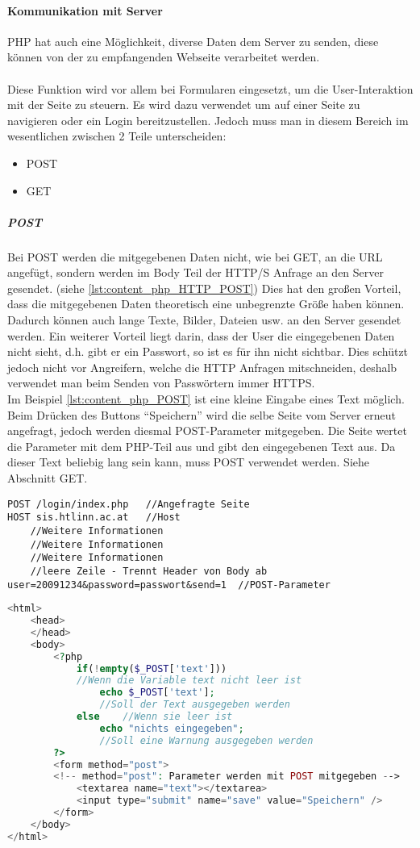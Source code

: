\paragraph{Kommunikation mit Server}
PHP hat auch eine Möglichkeit, diverse Daten dem Server zu 
senden, diese können von der zu empfangenden Webseite verarbeitet werden.\\\\
Diese Funktion wird vor allem bei Formularen eingesetzt, um die User-Interaktion mit der Seite zu steuern. Es wird dazu verwendet um auf einer Seite zu navigieren oder ein Login bereitzustellen. Jedoch muss man in diesem Bereich im wesentlichen zwischen 2 Teile unterscheiden:
\begin{itemize}
    \item POST
    \item GET
\end{itemize}
\subparagraph{POST\\}
Bei POST werden die mitgegebenen Daten nicht, wie bei GET, an die URL angefügt, sondern werden im Body Teil der HTTP/S Anfrage an den Server gesendet. (siehe \autoref{lst:content_php_HTTP_POST}) Dies hat den großen Vorteil, dass die mitgegebenen Daten theoretisch eine unbegrenzte Größe haben können. Dadurch können auch lange Texte, Bilder, Dateien usw. an den Server gesendet werden. Ein weiterer Vorteil liegt darin, dass der User die eingegebenen Daten nicht sieht, d.h. gibt er ein Passwort, so ist es für ihn nicht sichtbar. Dies schützt jedoch nicht vor Angreifern, welche die HTTP Anfragen mitschneiden, deshalb verwendet man beim Senden von Passwörtern immer HTTPS.\\
Im Beispiel \autoref{lst:content_php_POST} ist eine kleine Eingabe eines Text möglich. Beim Drücken des Buttons \enquote{Speichern} wird die selbe Seite vom Server erneut angefragt, jedoch werden diesmal POST-Parameter mitgegeben. Die Seite wertet die Parameter mit dem PHP-Teil aus und gibt den eingegebenen Text aus. Da dieser Text beliebig lang sein kann, muss POST verwendet werden. Siehe Abschnitt GET.
\begin{lstlisting}[style=custom, caption={Ausschnitt HTTP POST Request},label={lst:content_php_HTTP_POST}]
POST /login/index.php	//Angefragte Seite
HOST sis.htlinn.ac.at	//Host
	//Weitere Informationen
	//Weitere Informationen
	//Weitere Informationen
	//leere Zeile - Trennt Header von Body ab
user=20091234&password=passwort&send=1	//POST-Parameter
\end{lstlisting}
\newpage
\begin{lstlisting}[style=custom, language=PHP, caption={Beispiel POST},label={lst:content_php_POST}]
<html>
	<head>
	</head>
	<body>
		<?php
			if(!empty($_POST['text']))	
			//Wenn die Variable text nicht leer ist
				echo $_POST['text'];	
				//Soll der Text ausgegeben werden
			else	//Wenn sie leer ist
				echo "nichts eingegeben";	
				//Soll eine Warnung ausgegeben werden
		?>
		<form method="post">	
		<!-- method="post": Parameter werden mit POST mitgegeben -->
			<textarea name="text"></textarea>
			<input type="submit" name="save" value="Speichern" />
		</form>
	</body>
</html>
\end{lstlisting}

